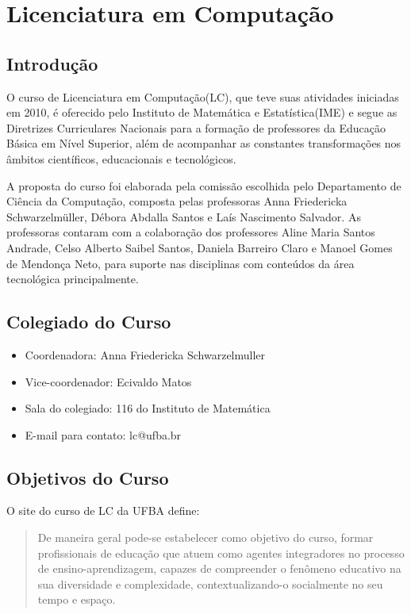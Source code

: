 \section{Licenciatura em Computação}

\subsection{Introdução}
O curso de Licenciatura em Computação(LC), que teve suas atividades iniciadas em 2010, é oferecido pelo Instituto de Matemática e Estatística(IME) e segue as Diretrizes Curriculares Nacionais para a formação de professores da Educação Básica em Nível Superior, além de acompanhar as constantes transformações nos âmbitos científicos, educacionais e tecnológicos. 

A proposta do curso foi elaborada pela comissão escolhida pelo Departamento de Ciência da Computação, composta pelas professoras Anna Friedericka Schwarzelmüller, Débora Abdalla Santos e Laís Nascimento Salvador. As professoras contaram com a colaboração dos professores Aline Maria Santos Andrade, Celso Alberto Saibel Santos, Daniela Barreiro Claro e Manoel Gomes de Mendonça Neto, para suporte nas disciplinas com conteúdos da área tecnológica principalmente.

\subsection{Colegiado do Curso}
\begin{itemize}
	\item {Coordenadora: Anna Friedericka Schwarzelmuller}
    \item {Vice-coordenador: Ecivaldo Matos}
    \item {Sala do colegiado: 116 do Instituto de Matemática}
    \item {E-mail para contato: lc@ufba.br}
\end{itemize}

\subsection{Objetivos do Curso}
    O site do curso de LC da UFBA define:
        \begin{quote}
        {\small De maneira geral pode-se estabelecer como objetivo do curso, formar profissionais de educação que atuem como agentes integradores no processo de ensino-aprendizagem, capazes de compreender o fenômeno educativo na sua diversidade e complexidade, contextualizando-o socialmente no seu tempo e    espaço.}
        \end{quote}

